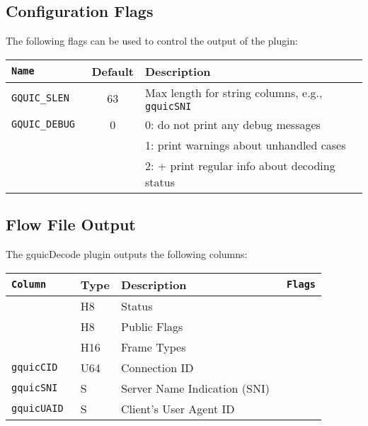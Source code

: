 \documentclass[documentation]{subfiles}
\begin{document}
\subsection{Configuration Flags}
The following flags can be used to control the output of the plugin:
\begin{longtable}{>{\tt}lcl}
    \toprule
    {\bf Name} & {\bf Default} & {\bf Description}\\
    \midrule\endhead%
    GQUIC\_SLEN  & 63  & Max length for string columns, e.g., {\tt gquicSNI}\\
    GQUIC\_DEBUG &  0  & 0: do not print any debug messages\\
                 &     & 1: print warnings about unhandled cases\\
                 &     & 2: + print regular info about decoding status\\
    \bottomrule
\end{longtable}

\subsection{Flow File Output}
The gquicDecode plugin outputs the following columns:
\begin{longtable}{>{\tt}lll>{\tt\small}l}
    \toprule
    {\bf Column} & {\bf Type} & {\bf Description} & {\bf Flags}\\
    \midrule\endhead%
    \nameref{gquicStat}       & H8  & Status                       & \\
    \nameref{gquicPubFlags}   & H8  & Public Flags                 & \\
    \nameref{gquicFrameTypes} & H16 & Frame Types                  & \\
    gquicCID                  & U64 & Connection ID                & \\
    gquicSNI                  & S   & Server Name Indication (SNI) & \\
    gquicUAID                 & S   & Client's User Agent ID       & \\
    \bottomrule
\end{longtable}
\end{document}
